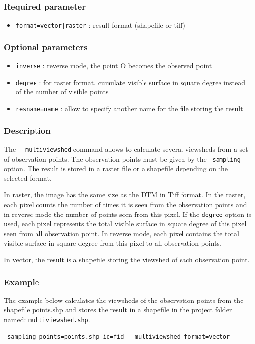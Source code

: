 \documentclass{report}
\begin{document}
\subsubsection{Required parameter}
\begin{itemize}
	\item \verb/format=vector|raster/ : result format (shapefile or tiff)
\end{itemize}

\subsubsection{Optional parameters}
\begin{itemize}
	\item \verb|inverse| : reverse mode, the point O becomes the observed point
	\item \verb|degree| : for raster format, cumulate visible surface in square degree instead of the number of visible points
	\item \verb|resname=name| : allow to specify another name for the file storing the result
\end{itemize}

\subsubsection{Description}
The \verb|--multiviewshed| command allows to calculate several viewsheds from a set of observation points. The observation points must be given by the \verb|-sampling| option. 
The result is stored in a raster file or a shapefile depending on the selected format.

In raster, the image has the same size as the DTM in Tiff format. In the raster, each pixel counts the number of times it is seen from the observation points and in reverse mode the number of points seen from this pixel. If the \verb|degree| option is used, each pixel represents the total visible surface in square degree of this pixel seen from all observation point. In reverse mode, each pixel contains the total visible surface in square degree from this pixel to all observation points.

In vector, the result is a shapefile storing the viewshed of each observation point.

\subsubsection{Example}
The example below calculates the viewsheds of the observation points from the shapefile points.shp and stores the result in a shapefile in the project folder named: \verb|multiviewshed.shp|.
\begin{Verbatim}
-sampling points=points.shp id=fid --multiviewshed format=vector
\end{Verbatim}
\end{document}
